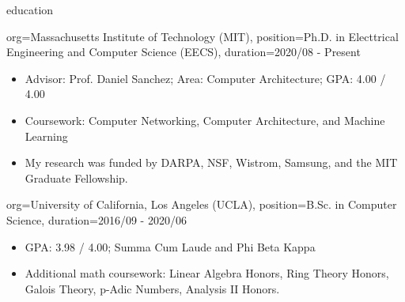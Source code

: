\documentclass{resume}
\begin{document}

\begin{ResumeSection}{education}
    \begin{ResumeSubsection}{org={Massachusetts Institute of Technology (MIT)},
        position={Ph.D. in Electtrical Engineering and Computer Science (EECS)},
        duration={2020/08 - Present}}
        \begin{itemize}
            \item Advisor: Prof. Daniel Sanchez; Area: Computer Architecture; GPA: 4.00 / 4.00
            \item Coursework: Computer Networking, Computer Architecture, and Machine Learning
            \item My research was funded by DARPA, NSF, Wistrom, Samsung, and the MIT Graduate Fellowship.
        \end{itemize}
    \end{ResumeSubsection}
    
    \begin{ResumeSubsection}{org={University of California, Los Angeles (UCLA)},
        position={B.Sc. in Computer Science},
        duration={2016/09 - 2020/06}}
        \begin{itemize}
            \item GPA: 3.98 / 4.00; Summa Cum Laude and Phi Beta Kappa
            \item Additional math coursework: Linear Algebra Honors, Ring Theory Honors,
                Galois Theory, p-Adic Numbers, Analysis II Honors.
        \end{itemize}
    \end{ResumeSubsection}
\end{ResumeSection}
\end{document}
